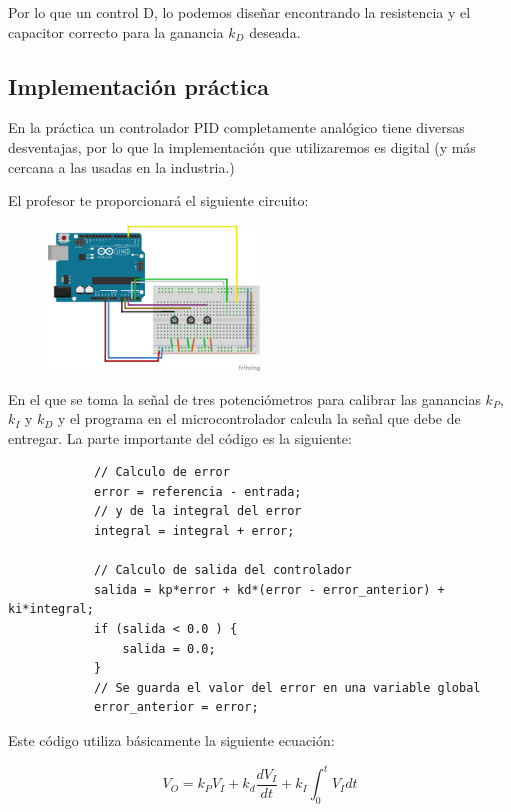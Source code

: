 			Por lo que un control D, lo podemos diseñar encontrando la resistencia y el capacitor correcto para la ganancia $k_D$ deseada.


	\subsection{Implementación práctica}

		En la práctica un controlador PID completamente analógico tiene diversas desventajas, por lo que la implementación que utilizaremos es digital (y más cercana a las usadas en la industria.)

		El profesor te proporcionará el siguiente circuito:

		\begin{figure}[h]
			\begin{center}
				\includegraphics[width=0.5\textwidth]{images/ControlPID.png}
			\end{center}
		\end{figure}

		En el que se toma la señal de tres potenciómetros para calibrar las ganancias $k_P$, $k_I$ y $k_D$ y el programa en el microcontrolador calcula la señal que debe de entregar. La parte importante del código es la siguiente:

		\begin{verbatim}
			// Calculo de error
			error = referencia - entrada;
			// y de la integral del error
			integral = integral + error;

			// Calculo de salida del controlador
			salida = kp*error + kd*(error - error_anterior) + ki*integral;
			if (salida < 0.0 ) {
				salida = 0.0;
			}
			// Se guarda el valor del error en una variable global
			error_anterior = error;
		\end{verbatim}

		Este código utiliza básicamente la siguiente ecuación:

		\begin{equation}
			V_O = k_P V_I + k_d \frac{d V_I}{dt} + k_I \int_0^t V_I dt
		\end{equation}

